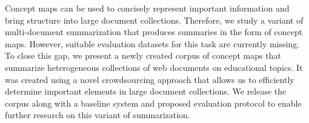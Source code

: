 Concept maps can be used to concisely represent important information and bring structure into large document collections. Therefore, we study a variant of multi-document summarization that produces summaries in the form of concept maps. However, suitable evaluation datasets for this task are currently missing. To close this gap, we present a newly created corpus of concept maps that summarize heterogeneous collections of web documents on educational topics. It was created using a novel crowdsourcing approach that allows us to efficiently determine important elements in large document collections. We release the corpus along with a baseline system and proposed evaluation protocol to enable further research on this variant of summarization.

